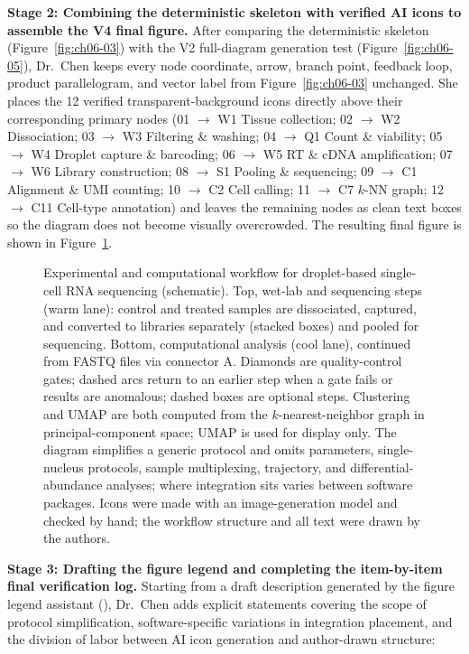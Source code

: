 \textbf{Stage 2: Combining the deterministic skeleton with verified AI icons to assemble the V4 final figure.}
After comparing the deterministic skeleton (Figure~\ref{fig:ch06-03}) with the V2 full-diagram generation test (Figure~\ref{fig:ch06-05}), Dr.\ Chen keeps every node coordinate, arrow, branch point, feedback loop, product parallelogram, and vector label from Figure~\ref{fig:ch06-03} unchanged. She places the 12 verified transparent-background icons directly above their corresponding primary nodes (01 $\rightarrow$ W1 Tissue collection; 02 $\rightarrow$ W2 Dissociation; 03 $\rightarrow$ W3 Filtering \& washing; 04 $\rightarrow$ Q1 Count \& viability; 05 $\rightarrow$ W4 Droplet capture \& barcoding; 06 $\rightarrow$ W5 RT \& cDNA amplification; 07 $\rightarrow$ W6 Library construction; 08 $\rightarrow$ S1 Pooling \& sequencing; 09 $\rightarrow$ C1 Alignment \& UMI counting; 10 $\rightarrow$ C2 Cell calling; 11 $\rightarrow$ C7 $k$-NN graph; 12 $\rightarrow$ C11 Cell-type annotation) and leaves the remaining nodes as clean text boxes so the diagram does not become visually overcrowded. The resulting final figure is shown in Figure~\ref{fig:ch06-06}.

\begin{figure}[htbp]\centering
\resizebox{0.94\linewidth}{!}{}
\caption{Experimental and computational workflow for droplet-based single-cell RNA sequencing (schematic). Top, wet-lab and sequencing steps (warm lane): control and treated samples are dissociated, captured, and converted to libraries separately (stacked boxes) and pooled for sequencing. Bottom, computational analysis (cool lane), continued from FASTQ files via connector A. Diamonds are quality-control gates; dashed arcs return to an earlier step when a gate fails or results are anomalous; dashed boxes are optional steps. Clustering and UMAP are both computed from the $k$-nearest-neighbor graph in principal-component space; UMAP is used for display only. The diagram simplifies a generic protocol and omits parameters, single-nucleus protocols, sample multiplexing, trajectory, and differential-abundance analyses; where integration sits varies between software packages. Icons were made with an image-generation model and checked by hand; the workflow structure and all text were drawn by the authors.}\label{fig:ch06-06}
\end{figure}

\textbf{Stage 3: Drafting the figure legend and completing the item-by-item final verification log.}
Starting from a draft description generated by the \scidraw{} figure legend assistant (), Dr.\ Chen adds explicit statements covering the scope of protocol simplification, software-specific variations in integration placement, and the division of labor between AI icon generation and author-drawn structure:

